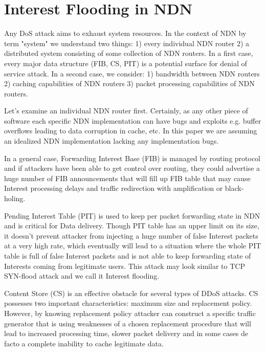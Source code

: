 \section{Interest Flooding in NDN}
\label{sec:interest flooding}


Any DoS attack aims to exhaust system resources. In the context of NDN by term "system" we understand two things: 1) every individual NDN router 2) a distributed system consisting of some collection of NDN routers. In a first case, every major data structure (FIB, CS, PIT) is a potential surface for denial of service attack. In a second case, we consider: 1) bandwidth between NDN routers 2) caching capabilities of NDN routers 3) packet processing capabilities of NDN routers.

Let's examine an individual NDN router first. Certainly, as any other piece of software each specific NDN implementation can have bugs and exploits e.g. buffer overflows leading to data corruption in cache, etc. In this paper we are assuming an idealized NDN implementation lacking any implementation bugs. 

In a general case, Forwarding Interest Base (FIB) is managed by routing protocol and if attackers have been able to get control over routing, they could advertise a huge number of FIB announcements that will fill up FIB table that may cause Interest processing delays and traffic redirection with amplification or black-holing.

Pending Interest Table (PIT) is used to keep per packet forwarding state in NDN and is critical for Data delivery. Though PIT table has an upper limit on its size, it doesn't prevent attacker from injecting a huge number of false Interest packets at a very high rate, which eventually will lead to a situation where the whole PIT table is full of false Interest packets and is not able to keep forwarding state of Interests coming from legitimate users. This attack may look similar to TCP SYN-flood attack and we call it Interest flooding. 

Content Store (CS) is an effective obstacle for several types of DDoS attacks. CS possesses two important characteristics: maximum size and replacement policy. However, by knowing replacement policy attacker can construct a specific traffic generator that is using weaknesses of a chosen replacement procedure that will lead to increased processing time, slower packet delivery and in some cases de facto a complete inability to cache legitimate data. 

